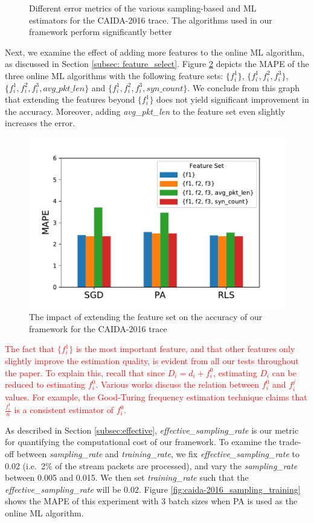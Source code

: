 		\begin{figure}
			\centering
			\small
			
			\caption{Different error metrics of the various sampling-based and ML estimators for the CAIDA-2016 trace. The algorithms used in our framework perform significantly better}
			\label{fig:caida-2016_error}
		\end{figure}
		
		Next, we examine the effect of adding more features to the online ML algorithm, as discussed in Section \ref{subsec: feature_select}. Figure \ref{fig:caida-2016_features} depicts the MAPE of the three online ML algorithms with the following feature sets: $\{f_i^1\}$, $\{f_i^1, f_i^2, f_i^3\}$,  $\{f_i^1, f_i^2, f_i^3, avg\_pkt\_len\}$ and $\{f_i^1, f_i^2, f_i^3, syn\_count\}$. We conclude from this graph that extending the features beyond $\{f_i^1\}$ does not yield significant improvement in the accuracy. Moreover, adding \emph{avg\_pkt\_len} to the feature set even slightly increases the error. 
		
		\begin{figure}[!tb]
			\centering
			\includegraphics[width=.49\textwidth]{img/caida-2016_features.pdf}
			\caption{The impact of extending the feature set on the accuracy of our framework for the CAIDA-2016 trace}
			\label{fig:caida-2016_features}
		\end{figure}

\textcolor{red}{
The fact that $\{f_i^1\}$ is the most important feature, and that other features
only slightly improve the estimation quality, is evident from all our tests
throughout the paper. To explain this, recall that 
since $D_i=d_i+f_i^0$,  estimating
$D_i$ can be reduced to estimating $f_i^0$.
Various works discuss
the relation between $f_i^0$ and $f_i^j$ values. For
example, the Good-Turing frequency estimation technique
\cite{good1953population} claims that $\frac{f_i^1}{n}$
is a consistent estimator of $f_i^0$.
}
		
As described in Section \ref{subsec:effective},
\emph{effective\_sampling\_rate} is our metric
for quantifying the computational cost of our
framework. To examine the trade-off between
\emph{sampling\_rate} and \emph{training\_rate},
we fix \emph{effective\_sampling\_rate} to 0.02
(i.e.\, 2\% of the stream packets are processed),
and vary the \emph{sampling\_rate} between 0.005 and
0.015. We then set \emph{training\_rate} such that the
\emph{effective\_sampling\_rate} will be 0.02. Figure
\ref{fig:caida-2016_sampling_training} shows the MAPE
of this experiment with 3 batch sizes when PA is used
as the online ML algorithm.

